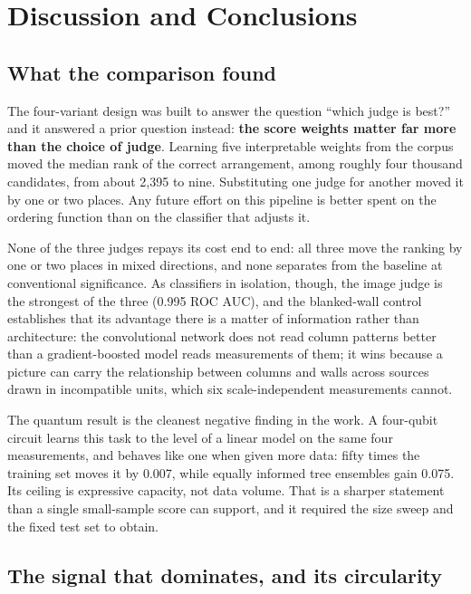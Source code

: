 \chapter{Discussion and Conclusions}
\label{ch:conclusion}

\section{What the comparison found}

The four-variant design was built to answer the question ``which judge is
best?'' and it answered a prior question instead: \textbf{the score weights
matter far more than the choice of judge}. Learning five interpretable
weights from the corpus moved the median rank of the correct arrangement,
among roughly four thousand candidates, from about 2,395 to nine.
Substituting one judge for another moved it by one or two places. Any
future effort on this pipeline is better spent on the ordering function
than on the classifier that adjusts it.

None of the three judges repays its cost end to end: all three move the
ranking by one or two places in mixed directions, and none separates from
the baseline at conventional significance. As classifiers in isolation,
though, the image judge is the strongest of the three (0.995 ROC AUC), and
the blanked-wall control establishes that its advantage there is a matter
of information rather than architecture: the convolutional network does
not read column patterns better than a gradient-boosted model reads
measurements of them; it wins because a picture can carry the relationship
between columns and walls across sources drawn in incompatible units,
which six scale-independent measurements cannot.

The quantum result is the cleanest negative finding in the work. A
four-qubit circuit learns this task to the level of a linear model on the
same four measurements, and behaves like one when given more data: fifty
times the training set moves it by 0.007, while equally informed tree
ensembles gain 0.075. Its ceiling is expressive capacity, not data volume.
That is a sharper statement than a single small-sample score can support,
and it required the size sweep and the fixed test set to obtain.

\section{The signal that dominates, and its circularity}

